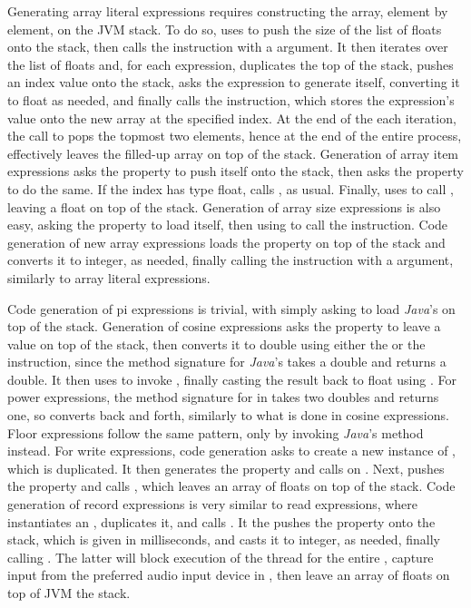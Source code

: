 Generating array literal expressions requires constructing the array, element by element, on the JVM stack. To do so,  uses  to push the size of the list of floats onto the stack, then calls the  instruction with a  argument. It then iterates over the list of floats and, for each expression, duplicates the top of the stack, pushes an index value onto the stack, asks the expression to generate itself, converting it to float as needed, and finally calls the  instruction, which stores the expression's value onto the new array at the specified index. At the end of the each iteration, the call to  pops the topmost two elements, hence at the end of the entire process,  effectively leaves the filled-up array on top of the stack. Generation of array item expressions asks the  property to push itself onto the stack, then asks the  property to do the same. If the index has type float,  calls , as usual. Finally,  uses  to call , leaving a float on top of the stack. Generation of array size expressions is also easy, asking the  property to load itself, then using  to call the  instruction. Code generation of new array expressions loads the  property on top of the stack and converts it to integer, as needed, finally calling the  instruction with a  argument, similarly to array literal expressions.

Code generation of pi expressions is trivial, with  simply asking  to load \emph{Java}'s  on top of the stack. Generation of cosine expressions asks the  property to leave a value on top of the stack, then converts it to double using either the  or the  instruction, since the method signature for \emph{Java}'s  takes a double and returns a double. It then uses  to invoke , finally casting the result back to float using . For power expressions, the method signature for  in  takes two doubles and returns one, so  converts back and forth, similarly to what is done in cosine expressions. Floor expressions follow the same pattern, only by invoking \emph{Java}'s  method instead. For write expressions, code generation asks  to create a new instance of , which is duplicated. It then generates the  property and calls  on . Next,  pushes the  property and calls , which leaves an array of floats on top of the stack. Code generation of record expressions is very similar to read expressions, where  instantiates an , duplicates it, and calls . It the pushes the  property onto the stack, which is given in milliseconds, and casts it to integer, as needed, finally calling . The latter will block execution of the  thread for the entire , capture input from the preferred audio input device in , then leave an array of floats on top of JVM the stack.

